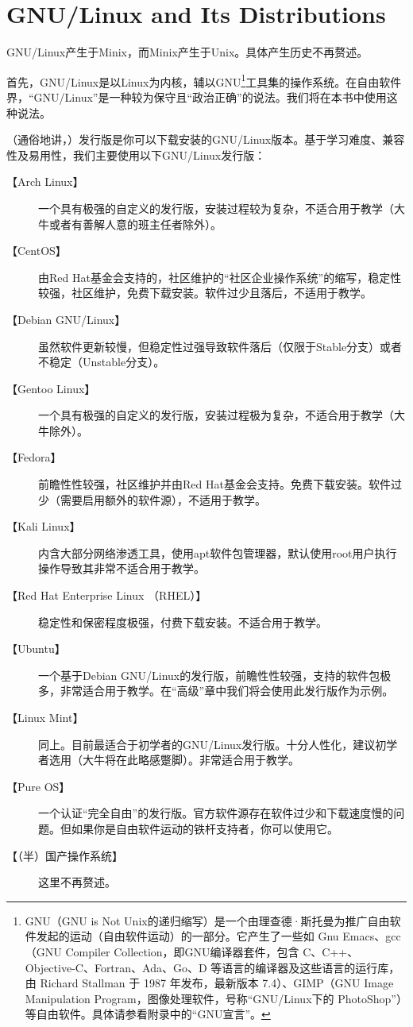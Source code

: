 \section{GNU/Linux and Its Distributions}
\label{sec:gnulinux} GNU/Linux产生于Minix，而Minix产生于Unix。具体产生历史不再赘述。\par
首先，GNU/Linux是以Linux为内核，辅以GNU\footnote{GNU（GNU is Not Unix的递归缩写）是一个由理查德·斯托曼为推广自由软件发起的运动（自由软件运动）的一部分。它产生了一些如 Gnu Emacs、gcc（GNU Compiler Collection，即GNU编译器套件，包含 C、C++、Objective-C、Fortran、Ada、Go、D 等语言的编译器及这些语言的运行库，由 Richard Stallman 于 1987 年发布，最新版本 7.4）、GIMP（GNU Image Manipulation Program，图像处理软件，号称“GNU/Linux下的 PhotoShop”）等自由软件。具体请参看附录中的“GNU宣言”。}工具集的操作系统。在自由软件界，“GNU/Linux”是一种较为保守且“政治正确”的说法。我们将在本书中使用这种说法。\par
（通俗地讲，）发行版是你可以下载安装的GNU/Linux版本。基于学习难度、兼容性及易用性，我们主要使用以下GNU/Linux发行版：
\begin{description}
	\item [【Arch Linux】] 一个具有极强的自定义的发行版，安装过程较为复杂，不适合用于教学（大牛或者有善解人意的班主任者除外）。
	\item [【CentOS】] 由Red Hat基金会支持的，社区维护的“社区企业操作系统”的缩写，稳定性较强，社区维护，免费下载安装。软件过少且落后，不适用于教学。
	\item [【Debian GNU/Linux】] 虽然软件更新较慢，但稳定性过强导致软件落后（仅限于Stable分支）或者不稳定（Unstable分支）。
	\item [【Gentoo Linux】] 一个具有极强的自定义的发行版，安装过程极为复杂，不适合用于教学（大牛除外）。
	\item [【Fedora】] 前瞻性性较强，社区维护并由Red Hat基金会支持。免费下载安装。软件过少（需要启用额外的软件源），不适用于教学。
	\item [【Kali Linux】] 内含大部分网络渗透工具，使用apt软件包管理器，默认使用root用户执行操作导致其非常不适合用于教学。
	\item [【Red Hat Enterprise Linux （RHEL）】] 稳定性和保密程度极强，付费下载安装。不适合用于教学。
	\item [【Ubuntu】] 一个基于Debian GNU/Linux的发行版，前瞻性性较强，支持的软件包极多，非常适合用于教学。在“高级”章中我们将会使用此发行版作为示例。
	\item [【Linux Mint】] 同上。目前最适合于初学者的GNU/Linux发行版。十分人性化，建议初学者选用（大牛将在此略感蹩脚）。非常适合用于教学。
	\item [【Pure OS】] 一个认证“完全自由”的发行版。官方软件源存在软件过少和下载速度慢的问题。但如果你是自由软件运动的铁杆支持者，你可以使用它。
	\item [【（半）国产操作系统】]这里不再赘述。
\end{description}
